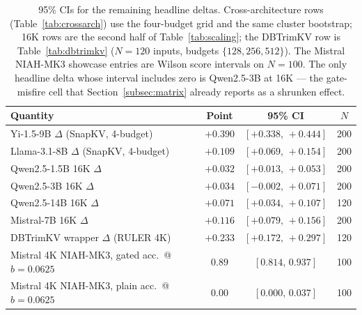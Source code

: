 \documentclass{article}
\begin{document}
\begin{table}[t]
\centering
\caption{95\% CIs for the remaining headline deltas. Cross-architecture rows
(Table~\ref{tab:crossarch}) use the four-budget grid and the same cluster
bootstrap; 16K rows are the second half of Table~\ref{tab:scaling}; the
DBTrimKV row is Table~\ref{tab:dbtrimkv} ($N = 120$ inputs, budgets
$\{128, 256, 512\}$). The Mistral NIAH-MK3 showcase entries are Wilson
score intervals on $N = 100$. The only headline delta whose interval
includes zero is Qwen2.5-3B at 16K --- the gate-misfire cell that
Section~\ref{subsec:matrix} already reports as a shrunken effect.}
\label{tab:other-ci}
\begin{tabular}{lccc}
\toprule
Quantity & Point & 95\% CI & $N$ \\
\midrule
Yi-1.5-9B $\Delta$ (SnapKV, 4-budget)      & $+0.390$ & $[+0.338,\,+0.444]$ & 200 \\
Llama-3.1-8B $\Delta$ (SnapKV, 4-budget)   & $+0.109$ & $[+0.069,\,+0.154]$ & 200 \\
\midrule
Qwen2.5-1.5B 16K $\Delta$                  & $+0.032$ & $[+0.013,\,+0.053]$ & 200 \\
Qwen2.5-3B 16K $\Delta$                    & $+0.034$ & $[-0.002,\,+0.071]$ & 200 \\
Qwen2.5-14B 16K $\Delta$                   & $+0.071$ & $[+0.034,\,+0.107]$ & 120 \\
Mistral-7B 16K $\Delta$                    & $+0.116$ & $[+0.079,\,+0.156]$ & 200 \\
\midrule
DBTrimKV wrapper $\Delta$ (RULER 4K)       & $+0.233$ & $[+0.172,\,+0.297]$ & 120 \\
\midrule
Mistral 4K NIAH-MK3, gated acc.\ @ $b{=}0.0625$ & $0.89$ & $[0.814,\,0.937]$ & 100 \\
Mistral 4K NIAH-MK3, plain acc.\ @ $b{=}0.0625$ & $0.00$ & $[0.000,\,0.037]$ & 100 \\
\bottomrule
\end{tabular}
\end{table}
\end{document}
